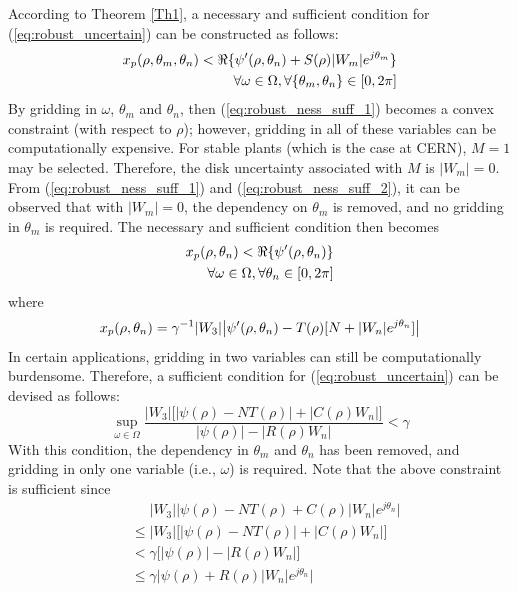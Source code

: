 \documentclass[journal]{IEEEtran}
\begin{document}
According to Theorem \ref{Th1}, a necessary and sufficient condition for (\ref{eq:robust_uncertain}) can be constructed as follows:
\begin{equation} \label{eq:robust_ness_suff_2}
\begin{split} 
 x_p (\rho,\theta_m,\theta_n) < \Re \{ \psi\sp{\prime}(\rho,\theta_n)+ S(\rho)|W_m|e^{j\theta_m} \} \\
\forall \omega \in \Omega, \forall \{\theta_m,\theta_n\} \in [0,2\pi]
\end{split}
\end{equation}
By gridding in $\omega$, $\theta_m$ and $\theta_n$, then (\ref{eq:robust_ness_suff_1}) becomes a convex constraint (with respect to $\rho$); however, gridding in all of these variables can be computationally expensive. For stable plants (which is the case at CERN), $M = 1$ may be selected. Therefore, the disk uncertainty associated with $M$ is $|W_m| = 0$. From (\ref{eq:robust_ness_suff_1}) and (\ref{eq:robust_ness_suff_2}), it can be observed that with $|W_m| = 0$, the dependency on $\theta_m$ is removed, and no gridding in $\theta_m$ is required. The necessary and sufficient condition then becomes
\begin{equation} \label{eq:robust_ness_suff_3}
\begin{split} 
 x_p (\rho,\theta_n) < \Re \{ \psi\sp{\prime}(\rho,\theta_n)\} \\
\forall \omega \in \Omega, \forall \theta_n \in [0,2\pi]
\end{split}
\end{equation}
where
\begin{equation} \label{eq:robust_ness_suff_4}
\begin{split} 
x_p (\rho,\theta_n)  = \gamma^{-1}|W_3| \bigl| \psi\sp{\prime}(\rho,\theta_n)  - T(\rho)[N+|W_n|e^{j\theta_n}] \bigr|
\end{split}
\end{equation}
In certain applications, gridding in two variables can still be computationally burdensome. Therefore, a sufficient condition for (\ref{eq:robust_uncertain}) can be devised as follows:
\begin{equation} \label{eq:uncertain_condition}
\sup_{\omega \in \Omega} \frac{|W_3|\bigl[|\psi(\rho)-NT(\rho)|  + |C(\rho)W_n | \bigr]}{|\psi(\rho)| -|R(\rho)W_n| } < \gamma
\end{equation}
With this condition, the dependency in $\theta_m$ and $\theta_n$ has been removed, and gridding in only one variable (i.e., $\omega$) is required. Note that the above constraint is sufficient since
\begin{align*}
 & \phantom{{}\leq{}} |W_3|  \bigl| \psi(\rho)  -NT(\rho) + C(\rho)|W_n|e^{j\theta_n} \bigr| \\
 & \leq |W_3|\bigl[|\psi(\rho)-NT(\rho)|  + |C(\rho)W_n | \bigr] \\
 & < \gamma \bigl[ |\psi(\rho)| -|R(\rho)W_n| \bigr] \\
 & \leq \gamma \bigl| \psi(\rho) +R(\rho)|W_n|e^{j\theta_n} \bigr|
\end{align*}
\end{document}
